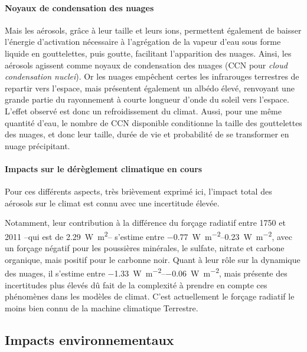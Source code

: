\paragraph{Noyaux de condensation des nuages}%
\label{par:noyaux_de_condensation_des_nuages}

Mais les aérosols, grâce à leur taille et leurs ions, permettent également de baisser
l'énergie d'activation nécessaire à l'agrégation de la vapeur d'eau sous forme liquide en
gouttelettes, puis goutte, facilitant l'apparition des nuages. Ainsi, les aérosols agissent
comme noyaux de condensation des nuages (CCN pour \textit{cloud condensation nuclei}). Or
les nuages empêchent certes les infrarouges terrestres de repartir vers l'espace, mais
présentent également un albédo élevé, renvoyant une grande partie du rayonnement à courte
longueur d'onde du soleil vers l'espace. L'effet observé est donc un refroidissement du
climat.
Aussi, pour une même quantité d'eau, le nombre de CCN disponible conditionne la taille des
gouttelettes des nuages, et donc leur taille, durée de vie et probabilité de se
transformer en nuage précipitant.

\paragraph{Impacts sur le dérèglement climatique en cours}%
\label{par:impacts_sur_le_dereglement_climatique_en_cours}

Pour ces différents aspects, très brièvement exprimé ici, l'impact total des aérosols sur
le climat est connu avec une incertitude élevée. 

Notamment, leur contribution à la différence du forçage radiatif entre 1750 et 2011 --qui
est de \SI{2.29}{\W\m\squared}-- s'estime entre
\SIrange[range-phrase=~et~]{-0.77}{0.23}{\W\per\m\squared}, avec un forçage négatif pour
les poussières minérales, le sulfate, nitrate et carbone organique, mais positif pour le
carbonne noir.  Quant à leur rôle sur la dynamique des nuages, il s'estime entre
\SIrange[range-phrase=~et~]{-1.33}{-0.06}{\W\per\m\squared}, mais présente des
incertitudes plus élevés dû fait de la complexité à prendre en compte ces phénomènes dans
les modèles de climat. C'est actuellement le forçage radiatif le moins bien connu de la
machine climatique Terrestre.

\subsection{Impacts environnementaux}%
\label{sub:impacts_environnementaux}

